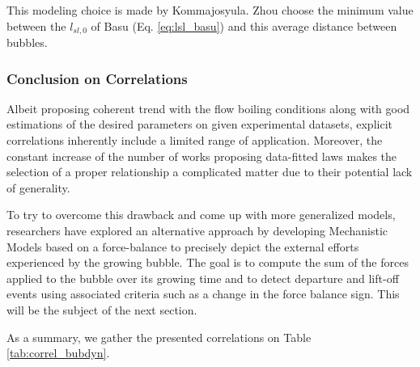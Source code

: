 \begin{remark*}{}
This modeling choice is made by Kommajosyula. Zhou \etal choose the minimum value between the $l_{sl,0}$ of Basu (Eq. \ref{eq:lsl_basu}) and this average distance between bubbles.
\end{remark*}

\subsubsection{Conclusion on Correlations}

Albeit proposing coherent trend with the flow boiling conditions along with good estimations of the desired parameters on given experimental datasets, explicit correlations inherently include a limited range of application. Moreover, the constant increase of the number of works proposing data-fitted laws makes the selection of a proper relationship a complicated matter due to their potential lack of generality.

\npar

To try to overcome this drawback and come up with more generalized models, researchers have explored an alternative approach by developing Mechanistic Models based on a force-balance to precisely depict the external efforts experienced by the growing bubble. The goal is to compute the sum of the forces applied to the bubble over its growing time and to detect departure and lift-off events using associated criteria such as a change in the force balance sign. This will be the subject of the next section.

\npar

As a summary, we gather the presented correlations on Table \ref{tab:correl_bubdyn}.


